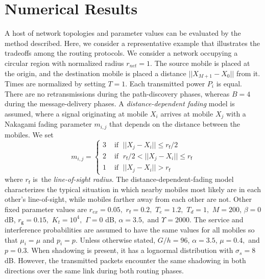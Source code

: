 \documentclass[conference]{IEEEtran}
\begin{document}
\section{Numerical Results}

A host of network topologies and parameter values can be evaluated by the
method described. Here, we consider a representative example that illustrates
the tradeoffs among the routing protocols. We consider a network occupying a
circular region with normalized radius $r_{net}=1.$ The source mobile is
placed at the origin, and the destination mobile is placed a distance
$||X_{M+1}-X_{0}||$ from it. Times are normalized by setting $T=1$. Each
transmitted power ${P}_{i}$ is equal. There are no retransmissions during the
path-discovery phases, whereas $B=4$ during the message-delivery phases$.$
A \emph{distance-dependent fading} model is assumed, where a signal
originating at mobile $X_{i}$ arrives at mobile $X_{j}$ with a Nakagami fading
parameter $m_{i,j}$ that depends on the distance between the mobiles. We set
\begin{equation}
m_{i,j}=\begin{cases}
3 & \mbox{ if }\;||X_{j}-X_{i}||\leq r_{\mathsf{f}}/2\\
2 & \mbox{ if }\;r_{\mathsf{f}}/2<||X_{j}-X_{i}||\leq r_{\mathsf{f}}\\
1 & \mbox{ if }\;||X_{j}-X_{i}||>r_{\mathsf{f}}\end{cases}
\end{equation}
where $r_{\mathsf{f}}$ is\ the \emph{line-of-sight radius}. The
distance-dependent-fading model characterizes the typical situation in which
nearby mobiles most likely are in each other's line-of-sight, while mobiles
farther away from each other are not. Other fixed parameter values are
$r_{ex}=0.05,$ $r_{\mathsf{f}}=0.2,$ $T_{e}=1.2,$ $T_{d}=1,$ $M=200$, $\beta=0$ dB,
$r_{\mathsf{g}}=0.15,$ $K_{t}=10^{4},$ $\Gamma=0$ dB, $\alpha=3.5,$
and $\Upsilon=2000.$ The service and interference probabilities
are assumed to have the same values for all mobiles
so that $\mu_{i}=\mu$ and
$p_{i}=p$. Unless otherwise stated, $G/h=96$, $\alpha=3.5$, $\mu=0.4,$ and $p=0.3.$ When
shadowing is present, it has a lognormal distribution with $\sigma_{s}=8$ dB.
However, the transmitted packets encounter the same shadowing in both directions over the same link during both routing phases.
\end{document}
